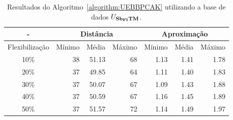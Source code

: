 \begin{table}[!htb]
  \caption{Resultados do Algoritmo~\ref{algorithm:UEBBPCAK} utilizando a base de dados $U_{\textbf{Sb\textsubscript{FI}TM}}{}$.}
  \label{table:OAYXLAOR}
  \centering
  \begin{tabular}{|c|r|r|r|r|r|r|}
    \hline
      -            & \multicolumn{3}{c|}{Distância}             & \multicolumn{3}{c|}{Aproximação}           \\ \hline
    Flexibilização & Mínimo       & Média        & Máximo       & Mínimo       & Média        & Máximo       \\ \hline  
    10\%           & 38           & 51.13        & 68           & 1.13         & 1.41         & 1.78         \\ \hline
    20\%           & 37           & 49.85        & 64           & 1.11         & 1.40         & 1.83         \\ \hline
    30\%           & 37           & 50.07        & 67           & 1.09         & 1.43         & 1.88         \\ \hline
    40\%           & 37           & 50.59        & 67           & 1.16         & 1.45         & 1.89         \\ \hline
    50\%           & 37           & 51.57        & 72           & 1.14         & 1.49         & 1.97         \\ \hline    
  \end{tabular}
\end{table}